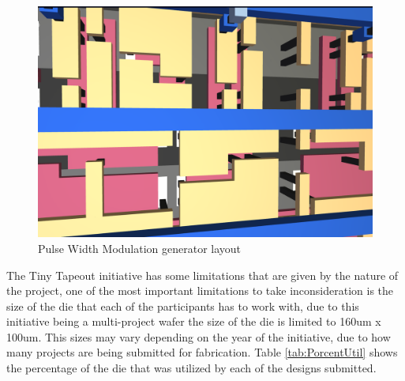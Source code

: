  
\begin{figure}[H]
    \centering
        \includegraphics[width=\linewidth]{Pictures/Specific_Layout.png}
    \caption{Pulse Width Modulation generator layout}\label{fig:Specific_Layout}
\end{figure}

The Tiny Tapeout initiative has some limitations that are given by the nature of the project, one of 
the most important limitations to take inconsideration is the size of the die that each of the participants has 
to work with, due to this initiative being a multi-project wafer the size of the die is limited to 160um x 100um. 
This sizes may vary depending on the year of the initiative, due to how many projects are being submitted for fabrication. 
Table \ref*{tab:PorcentUtil} shows the percentage of the die that was utilized by each of the designs submitted.

\begin{table}[H]
    \centering
    \caption{Porcentaje utilize in length of waver per circuit}\label{tab:PorcentUtil}
\end{table}


